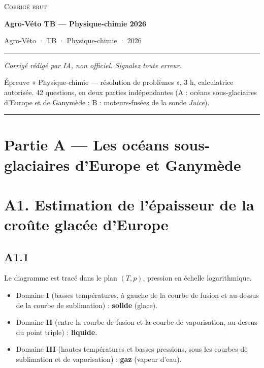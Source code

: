 \documentclass[11pt,a4paper]{article}
\providecommand{\tightlist}{\setlength{\itemsep}{0pt}\setlength{\parskip}{0pt}}
\begin{document}
\thispagestyle{plain}
\begin{center}
  {\small\scshape Corrigé brut}\par\smallskip
  {\LARGE\bfseries Agro-Véto TB — Physique-chimie 2026\par}\medskip
  {\large Agro-Véto · TB · Physique-chimie · 2026\par}
\end{center}
\vspace{2pt}\hrule\vspace{8pt}

\emph{Corrigé rédigé par IA, non officiel. Signalez toute erreur.}

Épreuve « Physique-chimie --- résolution de problèmes », 3 h, calculatrice autorisée. 42 questions, en deux parties indépendantes (A : océans sous-glaciaires d'Europe et de Ganymède ; B : moteurs-fusées de la sonde \emph{Juice}).

\begin{center}\rule{0.5\linewidth}{0.5pt}\end{center}

\hypertarget{partie-a-les-ocuxe9ans-sous-glaciaires-deurope-et-ganymuxe8de}{%
\section{Partie A --- Les océans sous-glaciaires d'Europe et Ganymède}\label{partie-a-les-ocuxe9ans-sous-glaciaires-deurope-et-ganymuxe8de}}

\hypertarget{a1.-estimation-de-luxe9paisseur-de-la-crouxfbte-glacuxe9e-deurope}{%
\section{A1. Estimation de l'épaisseur de la croûte glacée d'Europe}\label{a1.-estimation-de-luxe9paisseur-de-la-crouxfbte-glacuxe9e-deurope}}

\hypertarget{a1.1}{%
\subsection{A1.1}\label{a1.1}}

Le diagramme est tracé dans le plan \((T, p)\), pression en échelle logarithmique.

\begin{itemize}
\tightlist
\item
  Domaine \textbf{I} (basses températures, à gauche de la courbe de fusion et au-dessus de la courbe de sublimation) : \textbf{solide} (glace).
\item
  Domaine \textbf{II} (entre la courbe de fusion et la courbe de vaporisation, au-dessus du point triple) : \textbf{liquide}.
\item
  Domaine \textbf{III} (hautes températures et basses pressions, sous les courbes de sublimation et de vaporisation) : \textbf{gaz} (vapeur d'eau).
\end{itemize}
\end{document}
